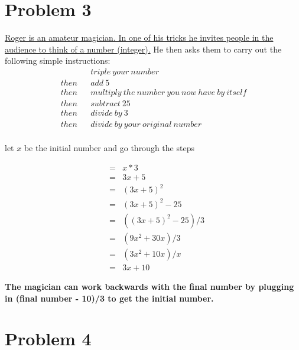 \documentclass[11pt]{article}
\begin{document}
	\newpage
	\section*{Problem 3} 
	
	{\underline{Roger is an amateur magician. In one of his tricks he invites people in the audience to think of a number (integer).}} He then asks them to carry out the following simple instructions:
	\begin{eqnarray*}
		&& triple \ your \ number \\
		then && add \ 5 \\
		then && multiply \ the \ number \ you \ now \ have \ by \ itself \\
		then && subtract \ 25 \\
		then && divide \ by\ 3 \\
		then && divide \ by \ your \ original \ number\\
	\end{eqnarray*}
	
	let $x$ be the initial number and go through the steps
	
	\begin{eqnarray*}
	&=& x*3\\
	&=& 3x+5\\
	&=& (3x+5)^2\\
	&=& (3x+5)^2-25\\
	&=& ((3x+5)^2-25)/3\\
	&=& (9x^2+30x)/3\\
	&=& (3x^2+10x)/x\\
	&=& 3x+10
	\end{eqnarray*}
	
	\textbf{The magician can work backwards with the final number by plugging in (final number - 10)/3 to get the initial number.}
	
	\section*{Problem 4} 
	
\end{document}
